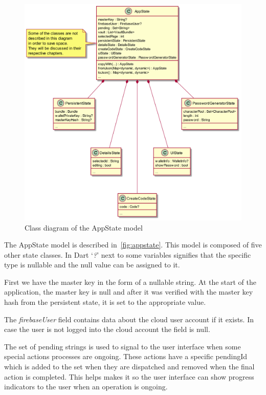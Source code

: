 \documentclass[a4paper,12pt]{report}
\begin{document}
\begin{figure}[H]
    \centering
    \includegraphics[scale=0.33]{diagrams/class/app_state.png}
    \caption{Class diagram of the AppState model}\label{fig:appstate}
\end{figure}

The AppState model is described in~\autoref{fig:appstate}. This model is
composed of five other state classes. In Dart `\textit{?}' next to some
variables signifies that the specific type is nullable and the null value can
be assigned to it.

First we have the master key in the form of a nullable string. At the start of
the application, the master key is null and after it was verified with the
master key hash from the persistent state, it is set to the appropriate value.

The \textit{firebaseUser} field contains data about the cloud user account if
it exists. In case the user is not logged into the cloud account the field is
null.

The set of pending strings is used to signal to the user interface when some
special actions processes are ongoing. These actions have a specific pendingId
which is added to the set when they are dispatched and removed when the final
action is completed. This helps makes it so the user interface can show
progress indicators to the user when an operation is ongoing.
\end{document}
